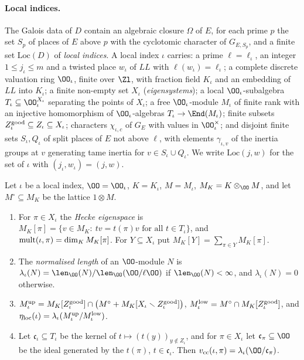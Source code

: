 \paragraph{Local indices.}
The Galois data of $D$ contain an algebraic closure $\Omega$ of $E$, for each prime $p$ the set $S_p$ of places of $E$
above $p$ with the cyclotomic character of $G_{E,S_p}$, and a finite set $\mathrm{Loc}(D)$ of \emph{local indices}. A
local index $\iota$ carries: a prime $\ell=\ell_\iota$, an integer $1\le j_\iota\le m$ and a twisted place $w_\iota$ of
$\mathit{LL}$ with $\ell(w_\iota)=\ell_\iota$; a complete discrete valuation ring $\OO_\iota$, finite over $\Zl$, with
fraction field $K_\iota$ and an embedding of $\mathit{LL}$ into $K_\iota$; a finite non-empty set $X_\iota$
(\emph{eigensystems}); a local $\OO_\iota$-subalgebra $T_\iota\subseteq\OO_\iota^{X_\iota}$ separating the points of
$X_\iota$; a free $\OO_\iota$-module $M_\iota$ of finite rank with an injective homomorphism of $\OO_\iota$-algebras
$T_\iota\to\End(M_\iota)$; finite subsets $Z^{\mathrm{good}}_\iota\subseteq Z_\iota\subseteq X_\iota$; characters
$\chi_{\iota,c}$ of $G_E$ with values in $\OO_\iota^\times$; and disjoint finite sets $S_\iota,Q_\iota$ of split places of
$E$ not above $\ell$, with elements $\gamma_{\iota,v}$ of the inertia groups at $v$ generating tame inertia for
$v\in S_\iota\cup Q_\iota$. We write $\mathrm{Loc}(j,w)$ for the set of $\iota$ with $(j_\iota,w_\iota)=(j,w)$.

\begin{definition}\label{pf:linkN:localinv}
Let $\iota$ be a local index, $\OO=\OO_\iota$, $K=K_\iota$, $M=M_\iota$, $M_K=K\otimes_\OO M$, and let $M^\circ\subseteq M_K$
be the lattice $1\otimes M$.
\begin{enumerate}[label=(\alph*)]
\item For $\pi\in X_\iota$ the \emph{Hecke eigenspace} is $M_K[\pi]=\{v\in M_K:\ tv=t(\pi)v\text{ for all }t\in T_\iota\}$,
and $\mathrm{mult}(\iota,\pi)=\dim_K M_K[\pi]$. For $Y\subseteq X_\iota$ put $M_K[Y]=\sum_{\pi\in Y}M_K[\pi]$.
\item The \emph{normalised length} of an $\OO$-module $N$ is $\lambda_\iota(N)=\len_\OO(N)/\len_\OO(\OO/\ell\OO)$ if
$\len_\OO(N)<\infty$, and $\lambda_\iota(N)=0$ otherwise.
\item $M^{\mathrm{up}}_\iota=M_K[Z^{\mathrm{good}}_\iota]\cap\bigl(M^\circ+M_K[X_\iota\smallsetminus Z^{\mathrm{good}}_\iota]\bigr)$,
$M^{\mathrm{low}}_\iota=M^\circ\cap M_K[Z^{\mathrm{good}}_\iota]$, and $\eta_{\mathrm{loc}}(\iota)=\lambda_\iota(M^{\mathrm{up}}_\iota/M^{\mathrm{low}}_\iota)$.
\item Let $\mathfrak c_\iota\subseteq T_\iota$ be the kernel of $t\mapsto(t(y))_{y\notin Z_\iota}$, and for $\pi\in X_\iota$
let $\mathfrak c_\pi\subseteq\OO$ be the ideal generated by the $t(\pi)$, $t\in\mathfrak c_\iota$. Then
$\linkNvcc(\iota,\pi)=\lambda_\iota(\OO/\mathfrak c_\pi)$.
\end{enumerate}
\end{definition}

